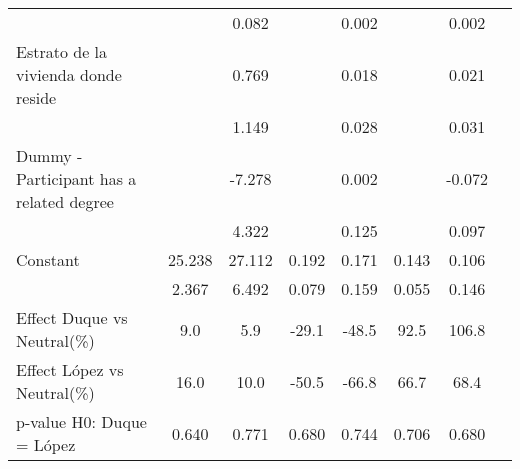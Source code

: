 \begin{table}[H]
{\begin{threeparttable}
\begin{tabular}{lccccccc}
                    &                     &       0.082         &                     &       0.002         &                     &       0.002         \\
Estrato de la vivienda donde reside&                     &       0.769         &                     &       0.018         &                     &       0.021         \\
                    &                     &       1.149         &                     &       0.028         &                     &       0.031         \\
Dummy - Participant has a related degree&                     &      -7.278\sym{*}  &                     &       0.002         &                     &      -0.072         \\
                    &                     &       4.322         &                     &       0.125         &                     &       0.097         \\
Constant            &      25.238\sym{***}&      27.112\sym{***}&       0.192\sym{**} &       0.171         &       0.143\sym{**} &       0.106         \\
                    &       2.367         &       6.492         &       0.079         &       0.159         &       0.055         &       0.146         \\
Effect Duque vs Neutral(\%)&         9.0         &         5.9         &       -29.1         &       -48.5         &        92.5         &       106.8         \\
Effect López vs Neutral(\%)&        16.0         &        10.0         &       -50.5         &       -66.8         &        66.7         &        68.4         \\
p-value H0: Duque = López&       0.640         &       0.771         &       0.680         &       0.744         &       0.706         &       0.680         \\

\end{tabular}
\end{threeparttable}}
\end{table}
